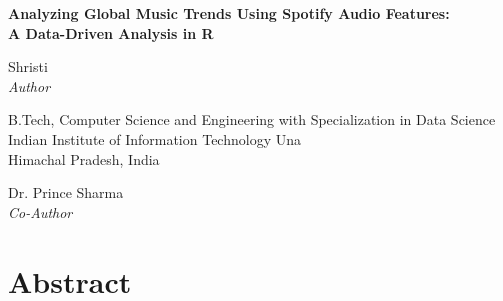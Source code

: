 \documentclass[12pt,a4paper]{article}
\begin{document}
\begin{titlepage}
\centering

\vspace*{\fill}   %

{\Large \textbf{Analyzing Global Music Trends Using Spotify Audio Features:}\\[0.4cm]
\textbf{A Data-Driven Analysis in R}}

\vspace{1.2cm}

{\large Shristi}\\[0.2cm]
\textit{Author}

\vspace{0.4cm}

B.Tech, Computer Science and Engineering with Specialization in Data Science\\[0.3cm]
Indian Institute of Information Technology Una\\
Himachal Pradesh, India

\vspace{0.8cm}
{\large Dr. Prince Sharma}\\[0.2cm]
\textit{Co-Author}

\vspace*{\fill}   %

\end{titlepage}
\setcounter{page}{1}

\newpage
\section*{Abstract}
\end{document}
